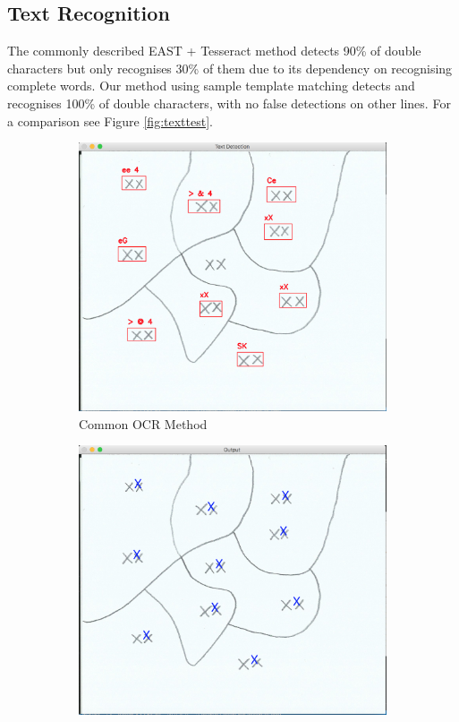 \documentclass{IEEEtran}
\begin{document}
\subsection{Text Recognition}

The commonly described EAST + Tesseract method detects 90\% of double characters but only recognises 30\% of them due to its dependency on recognising complete words. Our method using sample template matching detects and recognises 100\% of double characters, with no false detections on other lines. For a comparison see Figure \ref{fig:texttest}.

\begin{figure}[h]
     \centering
     \begin{subfigure}[b]{0.4\textwidth}
         \centering
         \includegraphics[width=\textwidth]{ocrprior}
         \caption{Common OCR Method}
         \label{fig:ocrprior}
     \end{subfigure}
     \hfill
     \begin{subfigure}[b]{0.4\textwidth}
         \centering
         \includegraphics[width=\textwidth]{textrec}

\end{subfigure}
\end{figure}
\end{document}
